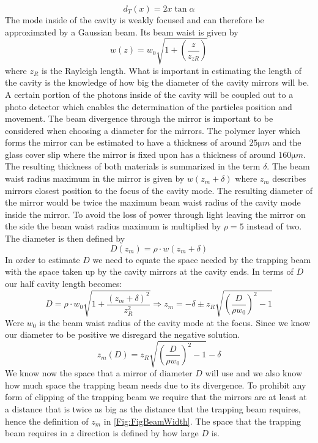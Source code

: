 \begin{equation}
	d_{\si{T}}(x)=2x\tan\alpha
\end{equation}
The mode inside of the cavity is weakly focused and can therefore be approximated by a Gaussian beam. Its beam waist is given by
\begin{equation}
	w(z)=w_0\sqrt{1+\left(\frac{z}{z_{z{\si{R}}}}\right)}
\end{equation}
where $z_{\si{R}}$ is the Rayleigh length. What is important in estimating the length of the cavity is the knowledge of how big the diameter of the cavity mirrors will be. A certain portion of the photons inside of the cavity will be coupled out to a photo detector which enables the determination of the particles position and movement. The beam divergence through the mirror is important to be considered when choosing a diameter for the mirrors. The polymer layer which forms the mirror can be estimated to have a thickness of around $25\si{\micro m}$ and the glass cover slip where the mirror is fixed upon has a thickness of around $160\si{\micro m}$. The resulting thickness of both materials is summarized in the term $\delta$. The beam waist radius maximum in the mirror is given by $w(z_{\si{m}}+\delta)$ where $z_{\si{m}}$ describes mirrors closest position to the focus of the cavity mode. The resulting diameter of the mirror would be twice the maximum beam waist radius of the cavity mode inside the mirror. To avoid the loss of power through light leaving the mirror on the side the beam waist radius maximum is multiplied by $\rho = 5$ instead of two. The diameter is then defined by
\begin{equation}
	D(z_{\si{m}})=\rho\cdot w(z_{\si{m}}+\delta)
\end{equation}
In order to estimate $D$ we need to equate the space needed by the trapping beam with the space taken up by the cavity mirrors at the cavity ends. In terms of $D$ our half cavity length becomes:
$$D=\rho \cdot w_0\sqrt{1+\frac{(z_{\si{m}}+\delta)^2}{z_{\si{R}}^2}}\Rightarrow z_{\si{m}}=-\delta\pm z_{\si{R}}\sqrt{\left(\frac{D}{\rho w_0}\right)^2-1}$$
Were $w_0$ is the beam waist radius of the cavity mode at the focus. Since we know our diameter to be positive we disregard the negative solution.
\begin{equation}
	z_{\si{m}}(D)=z_{\si{R}}\sqrt{\left(\frac{D}{\rho w_0}\right)^2-1}-\delta
\end{equation}
We know now the space that a mirror of diameter $D$ will use and we also know how much space the trapping beam needs due to its divergence. To prohibit any form of clipping of the trapping beam we require that the mirrors are at least at a distance that is twice as big as the distance that the trapping beam requires, hence the definition of $z_{\si{m}}$ in \autoref{Fig:FigBeamWidth}. The space that the trapping beam requires in $z$ direction is defined by how large $D$ is.
